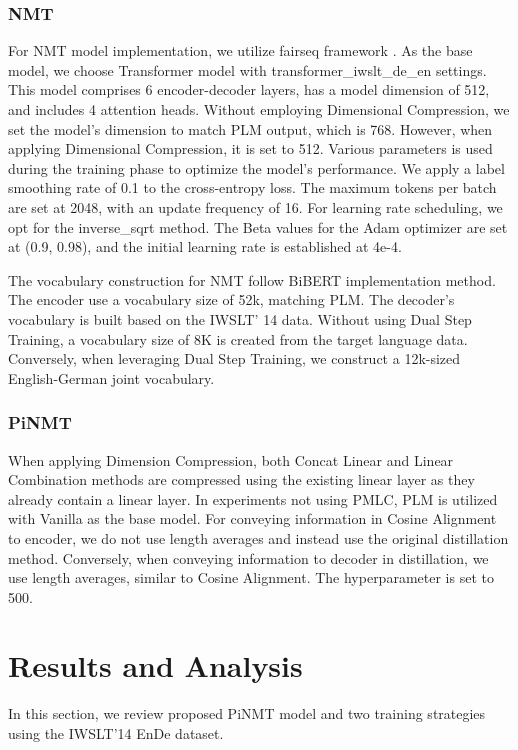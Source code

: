 \documentclass[conference]{IEEEtran}
\begin{document}
\subsubsection{NMT}
For NMT model implementation, we utilize fairseq framework \cite{ott2019fairseq}. As the base model, we choose Transformer model \cite{vaswani2017attention} with transformer\_iwslt\_de\_en settings. This model comprises 6 encoder-decoder layers, has a model dimension of 512, and includes 4 attention heads. Without employing Dimensional Compression, we set the model's dimension to match PLM output, which is 768. However, when applying Dimensional Compression, it is set to 512. Various parameters is used during the training phase to optimize the model's performance. We apply a label smoothing rate of 0.1 to the cross-entropy loss. The maximum tokens per batch are set at 2048, with an update frequency of 16. For learning rate scheduling, we opt for the inverse\_sqrt method. The Beta values for the Adam optimizer are set at (0.9, 0.98), and the initial learning rate is established at 4e-4.

The vocabulary construction for NMT follow BiBERT \cite{xu2021bibert} implementation method. The encoder use a vocabulary size of 52k, matching PLM. The decoder's vocabulary is built based on the IWSLT' 14 data. Without using Dual Step Training, a vocabulary size of 8K is created from the target language data. Conversely, when leveraging Dual Step Training, we construct a 12k-sized English-German joint vocabulary.

\subsubsection{PiNMT}
When applying Dimension Compression, both Concat Linear and Linear Combination methods are compressed using the existing linear layer as they already contain a linear layer. In experiments not using PMLC, PLM is utilized with Vanilla as the base model. For conveying information in Cosine Alignment to encoder, we do not use length averages and instead use the original distillation method. Conversely, when conveying information to decoder in distillation, we use length averages, similar to Cosine Alignment. The hyperparameter  is set to 500.



\section{Results and Analysis}
In this section, we review proposed PiNMT model and two training strategies using the IWSLT'14 EnDe dataset.
\end{document}
